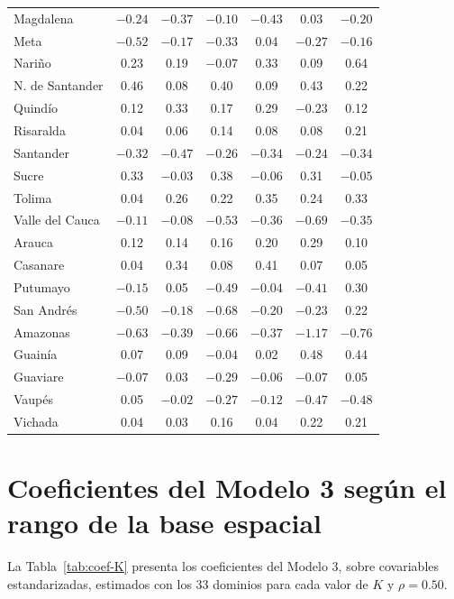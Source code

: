 \begin{longtable}{l c c c c c c}
Magdalena & $-0.24$ & $-0.37$ & $-0.10$ & $-0.43$ & 0.03 & $-0.20$ \\
Meta & $-0.52$ & $-0.17$ & $-0.33$ & 0.04 & $-0.27$ & $-0.16$ \\
Nariño & 0.23 & 0.19 & $-0.07$ & 0.33 & 0.09 & 0.64 \\
N. de Santander & 0.46 & 0.08 & 0.40 & 0.09 & 0.43 & 0.22 \\
Quindío & 0.12 & 0.33 & 0.17 & 0.29 & $-0.23$ & 0.12 \\
Risaralda & 0.04 & 0.06 & 0.14 & 0.08 & 0.08 & 0.21 \\
Santander & $-0.32$ & $-0.47$ & $-0.26$ & $-0.34$ & $-0.24$ & $-0.34$ \\
Sucre & 0.33 & $-0.03$ & 0.38 & $-0.06$ & 0.31 & $-0.05$ \\
Tolima & 0.04 & 0.26 & 0.22 & 0.35 & 0.24 & 0.33 \\
Valle del Cauca & $-0.11$ & $-0.08$ & $-0.53$ & $-0.36$ & $-0.69$ & $-0.35$ \\
Arauca & 0.12 & 0.14 & 0.16 & 0.20 & 0.29 & 0.10 \\
Casanare & 0.04 & 0.34 & 0.08 & 0.41 & 0.07 & 0.05 \\
Putumayo & $-0.15$ & 0.05 & $-0.49$ & $-0.04$ & $-0.41$ & 0.30 \\
San Andrés & $-0.50$ & $-0.18$ & $-0.68$ & $-0.20$ & $-0.23$ & 0.22 \\
Amazonas & $-0.63$ & $-0.39$ & $-0.66$ & $-0.37$ & $-1.17$ & $-0.76$ \\
Guainía & 0.07 & 0.09 & $-0.04$ & 0.02 & 0.48 & 0.44 \\
Guaviare & $-0.07$ & 0.03 & $-0.29$ & $-0.06$ & $-0.07$ & 0.05 \\
Vaupés & 0.05 & $-0.02$ & $-0.27$ & $-0.12$ & $-0.47$ & $-0.48$ \\
Vichada & 0.04 & 0.03 & 0.16 & 0.04 & 0.22 & 0.21 \\
\end{longtable}
\normalsize

\section{Coeficientes del Modelo 3 según el rango de la base espacial}
\label{sec:apendice-coef-K}

La Tabla~\ref{tab:coef-K} presenta los coeficientes del Modelo 3, sobre covariables estandarizadas, estimados con los 33 dominios para cada valor de $K$ y $\rho=0.50$.

